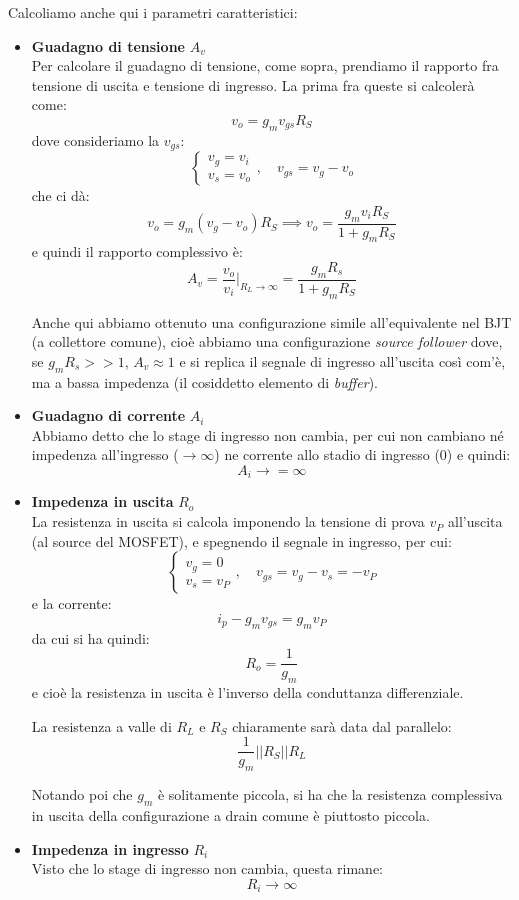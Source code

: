 \documentclass[a4paper,11pt]{article}
\begin{document}
Calcoliamo anche qui i parametri caratteristici:
\begin{itemize}
\item \textbf{\textsf{Guadagno di tensione}} $A_v$ \\
Per calcolare il guadagno di tensione, come sopra, prendiamo il rapporto fra tensione di uscita e tensione di ingresso. La prima fra queste si calcolerà come:
$$
v_o = g_m v_{gs} R_S 
$$
dove consideriamo la $v_{gs}$:
$$
\begin{cases}
v_g = v_i \\
v_s = v_o 
\end{cases}, \quad
v_{gs} = v_g - v_o
$$
che ci dà:
$$
v_o = g_m (v_g - v_o) R_S \implies v_o = \frac{g_m v_i R_S}{1 + g_m R_S} 
$$
e quindi il rapporto complessivo è:
$$
A_v = \frac{v_o}{v_i} \Big|_{R_L \rightarrow \infty} = \frac{g_m R_s}{1 + g_m R_S}
$$

Anche qui abbiamo ottenuto una configurazione simile all'equivalente nel BJT (a collettore comune), cioè abbiamo una configurazione \textit{source follower} dove, se $g_m R_s >> 1$, $A_v \approx 1$ e si replica il segnale di ingresso all'uscita così com'è, ma a bassa impedenza (il cosiddetto elemento di \textit{buffer}).

\item \textbf{\textsf{Guadagno di corrente}} $A_i$ \\
Abbiamo detto che lo stage di ingresso non cambia, per cui non cambiano né impedenza all'ingresso ($\rightarrow \infty$) ne corrente allo stadio di ingresso ($0$) e quindi:
$$
A_i \rightarrow = \infty
$$

\item \textbf{\textsf{Impedenza in uscita}} $R_o$ \\
La resistenza in uscita si calcola imponendo la tensione di prova $v_P$ all'uscita (al source del MOSFET), e spegnendo il segnale in ingresso, per cui:
$$
\begin{cases}
v_g = 0 \\
v_s = v_P
\end{cases}, \quad
v_{gs} = v_g - v_s = - v_P 
$$
e la corrente:
$$
i_p - g_m v_{gs} = g_m v_P
$$
da cui si ha quindi:
$$
R_o = \frac{1}{g_m}
$$
e cioè la resistenza in uscita è l'inverso della conduttanza differenziale.

La resistenza a valle di $R_L$ e $R_S$ chiaramente sarà data dal parallelo:
$$
\frac{1}{g_m} || R_S || R_L
$$

Notando poi che $g_m$ è solitamente piccola, si ha che la resistenza complessiva in uscita della configurazione a drain comune è piuttosto piccola.

\item \textbf{\textsf{Impedenza in ingresso}} $R_i$ \\
Visto che lo stage di ingresso non cambia, questa rimane:
$$
R_i \rightarrow \infty
$$
\end{itemize}
\end{document}
